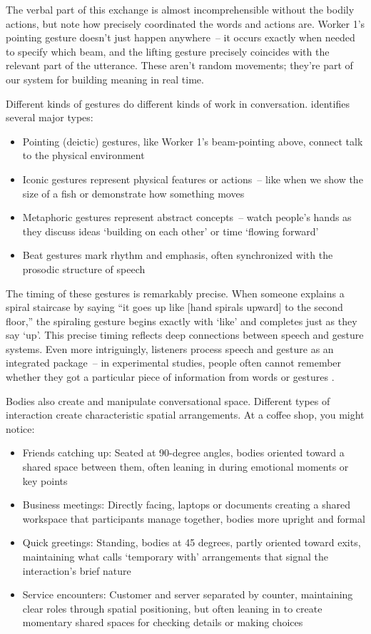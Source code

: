 \noindent The verbal part of this exchange is almost incomprehensible without the bodily actions, but note how precisely coordinated the words and actions are. Worker 1's pointing gesture doesn't just happen anywhere~-- it occurs exactly when needed to specify which beam, and the lifting gesture precisely coincides with the relevant part of the utterance. These aren't random movements; they're part of our system for building meaning in real time.

Different kinds of gestures do different kinds of work in conversation. \citet{mcneill1992} identifies several major types:
\begin{itemize}[noitemsep]
  \item Pointing (deictic) gestures, like Worker 1's beam-pointing above, connect talk to the physical environment 
  \item Iconic gestures represent physical features or actions~-- like when we show the size of a fish or demonstrate how something moves 
  \item Metaphoric gestures represent abstract concepts~-- watch people's hands as they discuss ideas `building on each other' or time `flowing forward' 
  \item Beat gestures mark rhythm and emphasis, often synchronized with the prosodic structure of speech 
\end{itemize}
The timing of these gestures is remarkably precise. When someone explains a spiral staircase by saying ``it goes up like [hand spirals upward] to the second floor,'' the spiraling gesture begins exactly with `like' and completes just as they say `up'. This precise timing reflects deep connections between speech and gesture systems. Even more intriguingly, listeners process speech and gesture as an integrated package~-- in experimental studies, people often cannot remember whether they got a particular piece of information from words or gestures \citep{gurney2013}.

Bodies also create and manipulate conversational space. Different types of interaction create characteristic spatial arrangements. At a coffee shop, you might notice:
\begin{itemize}[noitemsep]
  \item Friends catching up: Seated at 90-degree angles, bodies oriented toward a shared space between them, often leaning in during emotional moments or key points
  \item Business meetings: Directly facing, laptops or documents creating a shared workspace that participants manage together, bodies more upright and formal
  \item Quick greetings: Standing, bodies at 45 degrees, partly oriented toward exits, maintaining what \citet{kendon1990} calls `temporary with' arrangements that signal the interaction's brief nature
  \item Service encounters: Customer and server separated by counter, maintaining clear roles through spatial positioning, but often leaning in to create momentary shared spaces for checking details or making choices
\end{itemize}

